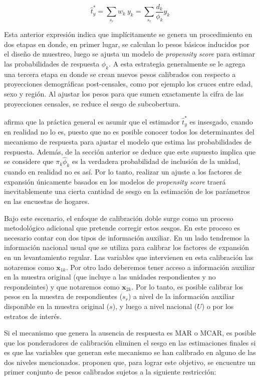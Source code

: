 \documentclass[
  10pt,
  spanish,
]{book}
\begin{document}
\[
\hat t_y^* = \sum_{s_r} w_k\ y_k = \sum_{s_r} \frac{d_k}{\phi_k} y_k 
\]

Esta anterior expresión indica que implícitamente se genera un procedimiento en dos etapas en donde, en primer lugar, se calculan lo pesos básicos inducidos por el diseño de muestreo, luego se ajusta un modelo de \emph{propensity score} para estimar las probabilidades de respuesta \(\phi_k\). A esta estrategia generalmente se le agrega una tercera etapa en donde se crean nuevos pesos calibrados con respecto a proyecciones demográficas post-censales, como por ejemplo los cruces entre edad, sexo y región. Al ajustar los pesos para que sumen exactamente la cifra de las proyecciones censales, se reduce el sesgo de subcobertura.

\citet{Sar08} afirma que la práctica general es asumir que el estimador \(\hat t_y^*\) es insesgado, cuando en realidad no lo es, puesto que no es posible conocer todos los determinantes del mecanismo de respuesta para ajustar el modelo que estima las probabilidades de respuesta. Además, de la sección anterior se deduce que este supuesto implica que se considere que \(\pi_k \hat\phi_k\) es la verdadera probabilidad de inclusión de la unidad, cuando en realidad no es así. Por lo tanto, realizar un ajuste a los factores de expansión únicamente basados en los modelos de \emph{propensity score} traerá inevitablemente una cierta cantidad de sesgo en la estimación de los parámetros en las encuestas de hogares.

Bajo este escenario, el enfoque de calibración doble surge como un proceso metodológico adicional que pretende corregir estos sesgos. En este proceso es necesario contar con dos tipos de información auxiliar. En un lado tendremos la información nacional usual que se utiliza para calibrar los factores de expansión en un levantamiento regular. Las variables que intervienen en esta calibración las notaremos como \(\boldsymbol{x}_{1k}\). Por otro lado deberemos tener acceso a información auxiliar en la muestra original (que incluye a las unidades respondientes y no respondeintes) y que notaremos como \(\boldsymbol{x}_{2k}\). Por lo tanto, es posible calibrar los pesos en la muestra de respondientes (\(s_r\)) a nivel de la información auxiliar disponible en la muestra original (\(s\)), y luego a nivel nacional (\(U\)) o por los estratos de interés.

Si el mecanismo que genera la ausencia de respuesta es MAR o MCAR, es posible que los ponderadores de calibración eliminen el sesgo en las estimaciones finales si es que las variables que generan este mecanismo se han calibrado en alguno de las dos niveles mencionados. \citet{Sarndal_Lundstrom_2006} proponen que, para lograr este objetivo, se encuentre un primer conjunto de pesos calibrados sujetos a la siguiente restricción:
\end{document}

